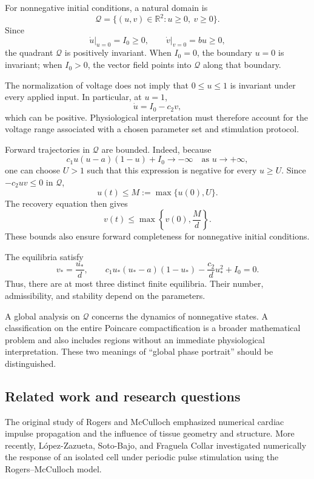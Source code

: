 \documentclass[11pt,reqno]{amsart}
\theoremstyle{plain}
\theoremstyle{definition}
\theoremstyle{remark}
\begin{document}
For nonnegative initial conditions, a natural domain is
\[
\mathcal Q=\{(u,v)\in\mathbb R^2:u\geq0,\ v\geq0\}.
\]
Since
\[
\left.\dot u\right|_{u=0}=I_0\geq0,
\qquad
\left.\dot v\right|_{v=0}=bu\geq0,
\]
the quadrant $\mathcal Q$ is positively invariant.
When $I_0=0$, the boundary $u=0$ is invariant;
when $I_0>0$, the vector field points into $\mathcal Q$
along that boundary.

The normalization of voltage does not imply that
$0\leq u\leq1$ is invariant under every applied input.
In particular, at $u=1$,
\[
\dot u=I_0-c_2v,
\]
which can be positive. Physiological interpretation
must therefore account for the voltage range associated
with a chosen parameter set and stimulation protocol.

Forward trajectories in $\mathcal Q$ are bounded.
Indeed, because
\[
c_1u(u-a)(1-u)+I_0\longrightarrow-\infty
\quad\text{as }u\longrightarrow+\infty,
\]
one can choose $U>1$ such that this expression is negative
for every $u\geq U$. Since $-c_2uv\leq0$ in $\mathcal Q$,
\[
u(t)\leq M:=\max\{u(0),U\}.
\]
The recovery equation then gives
\[
v(t)\leq \max\left\{v(0),\frac{M}{d}\right\}.
\]
These bounds also ensure forward completeness for
nonnegative initial conditions.

The equilibria satisfy
\begin{equation}
\label{eq:equilibrium-equation}
v_*=\frac{u_*}{d},
\qquad
c_1u_*(u_*-a)(1-u_*)
-\frac{c_2}{d}u_*^2+I_0=0.
\end{equation}
Thus, there are at most three distinct finite equilibria.
Their number, admissibility, and stability depend on the
parameters.

A global analysis on $\mathcal Q$ concerns the dynamics
of nonnegative states. A classification on the entire
Poincare compactification is a broader mathematical
problem and also includes regions without an immediate
physiological interpretation. These two meanings of
``global phase portrait'' should be distinguished.

\subsection{Related work and research questions}
\label{subsec:related-work}

The original study of Rogers and McCulloch
\cite{RogersMcCulloch1994} emphasized numerical cardiac
impulse propagation and the influence of tissue geometry
and structure. More recently, L\'opez-Zazueta,
Soto-Bajo, and Fraguela Collar
\cite{LopezZazueta2024} investigated numerically the
response of an isolated cell under periodic pulse
stimulation using the Rogers--McCulloch model.
\end{document}
